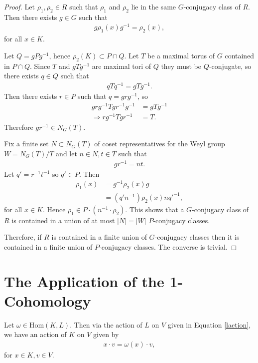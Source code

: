 \begin{proof}
	Let $\rho_1, \rho_2 \in R$ such that $\rho_1$ and $\rho_2$ lie in the same $G$-conjugacy class of $R$. Then there exists $g\in G$ such that
	\begin{align*}
		g \rho_1(x) g^{-1} = \rho_2(x),
	\end{align*}
for all $x \in K$.
	
	Let $Q = gPg^{-1}$, hence $\rho_2(K) \subset P \cap Q$.
	Let $T$ be a maximal torus of $G$ contained in $P\cap Q$. Since $T$ and $gTg^{-1}$ are maximal tori of $Q$ they must be $Q$-conjugate, so there exists $q\in Q$ such that
	\begin{align*}
		qTq^{-1} = gTg^{-1}.
	\end{align*}
	Then there exists $r\in P$ such that $q = grg^{-1}$, so
	\begin{align*}
		grg^{-1}Tgr^{-1}g^{-1} &= gTg^{-1} \\
		\Rightarrow rg^{-1}Tgr^{-1} &= T.
	\end{align*}
	Therefore $gr^{-1} \in N_G(T)$. 

	Fix a finite set $N \subset N_G(T)$ of coset representatives for the Weyl group $W = N_G(T)/T$ and let $n \in N, t \in T$ such that
	\begin{align*}
		gr^{-1} = nt.
	\end{align*}
	Let $q' = r^{-1}t^{-1}$ so $q' \in P$. Then
	\begin{align*}
		\rho_1(x) &= g^{-1} \rho_2(x) g\\
		&= (q'n^{-1}) \rho_2(x) nq'^{-1},
	\end{align*}
	for all $x \in K$. Hence $\rho_1\in P\cdot(n^{-1}\cdot \rho_2)$.
	This shows 
	that a $G$-conjugacy class of $R$ is contained in a union of at most $|N| = |W|$ $P$-conjugacy classes.

	Therefore, if $R$ is contained in a finite union of $G$-conjugacy classes then it is contained in a finite union of $P$-conjugacy classes. The converse is trivial.
\end{proof}


\section{The Application of the 1-Cohomology}
Let $\omega \in \mathrm{Hom}(K, L)$. Then via the action of $L$ on $V$ given in Equation \ref{laction}, we have an action of $K$ on $V$ given by
\begin{align} \label{haction} x \cdot v = \omega(x) \cdot v, \end{align}
for $x \in K, v \in V$.


